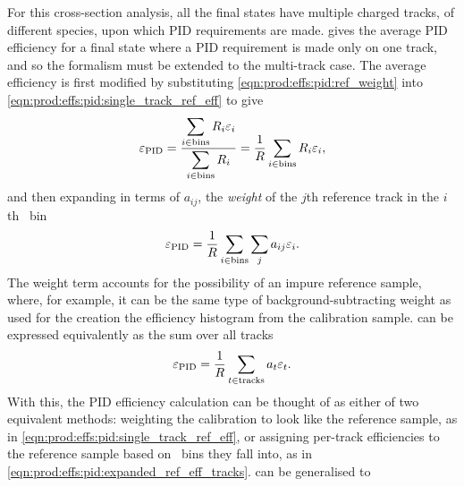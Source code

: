 
For this cross-section analysis, all the final states have multiple charged 
tracks, of different species, upon which \ac{PID} requirements are made.
 gives the average \ac{PID} 
efficiency for a final state where a \ac{PID} requirement is made only on one 
track, and so the formalism must be extended to the multi-track case.
The average efficiency is first modified by substituting 
\cref{eqn:prod:effs:pid:ref_weight} into 
\cref{eqn:prod:effs:pid:single_track_ref_eff} to give
\begin{equation}
  \effpid = \frac{%
    \displaystyle\sum_{i \in \textnormal{bins}} R_{i}\eff_{i}
  }{%
    \displaystyle\sum_{i \in \textnormal{bins}} R_{i}
  }
  = \frac{1}{R}\sum_{i \in \textnormal{bins}} R_{i}\eff_{i},
\end{equation}
and then expanding in terms of $a_{ij}$, the \emph{weight} of the $j$th 
reference track in the $i$th \ptotetanspd\ bin
\begin{equation}
  \varepsilon_{\textnormal{PID}} = \frac{1}{R}
            \sum_{i \in \textnormal{bins}}\sum_{j} a_{ij}\varepsilon_{i}.
  \label{eqn:prod:effs:pid:expanded_ref_eff}
\end{equation}
The weight term accounts for the possibility of an impure reference sample, 
where, for example, it can be the same type of background-subtracting weight as 
used for the creation the efficiency histogram from the calibration sample.
 can be expressed equivalently as the 
sum over all tracks
\begin{equation}
  \varepsilon_{\textnormal{PID}} = \frac{1}{R}
            \sum_{t \in \textnormal{tracks}} a_{t}\varepsilon_{t}.
  \label{eqn:prod:effs:pid:expanded_ref_eff_tracks}
\end{equation}
With this, the \ac{PID} efficiency calculation can be thought of as either of 
two equivalent methods: weighting the calibration to look like the reference 
sample, as in \cref{eqn:prod:effs:pid:single_track_ref_eff}, or assigning 
per-track efficiencies to the reference sample based on \ptotetanspd\ bins they 
fall into, as in \cref{eqn:prod:effs:pid:expanded_ref_eff_tracks}.
 can be generalised to 
